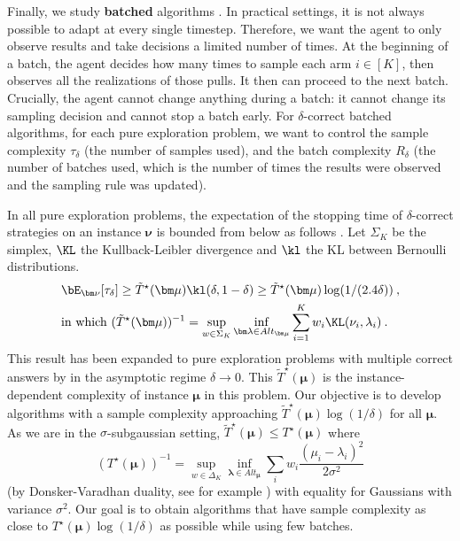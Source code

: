 Finally, we study \textbf{batched} algorithms \citep{agarwalLearningLimitedRounds2017,jinEfficientPureExploration2019}.
In practical settings, it is not always possible to adapt at every single timestep. 
Therefore, we want the agent to only observe results and take decisions a limited number of times.
At the beginning of a batch, the agent decides how many times to sample each arm $i \in [K]$, then observes all the realizations of those pulls.
It then can proceed to the next batch.
Crucially, the agent cannot change anything during a batch: it cannot change its sampling decision and cannot stop a batch early.
For $\delta$-correct batched algorithms, for each pure exploration problem, we want to control the sample complexity $\tau_\delta$ (the number of samples used), and the batch complexity $R_\delta$ (the number of batches used, which is the number of times the results were observed and the sampling rule was updated).


In all pure exploration problems, the expectation of the stopping time of $\delta$-correct strategies on an instance $\bm\nu$ is bounded from below as follows \citep{garivierOptimalBestArm2016}. Let $\Sigma_K$ be the simplex, $\KL$ the Kullback-Leibler divergence and $\kl$ the KL between Bernoulli distributions.
\begin{align*}
&\bE_{\bm\nu}[\tau_\delta]
\ge \tilde{T}^\star(\bm\mu) \kl(\delta,1-\delta)
\ge \tilde{T}^\star(\bm\mu) \log (1/(2.4 \delta))
\: , \\
&\text{in which }
(\tilde{T}^\star(\bm\mu))^{-1}
= \sup_{w\in \Sigma_K}\inf_{\bm\lambda\in Alt_{\bm\mu}} \sum_{i=1}^K w_i\KL(\nu_i,\lambda_i)
\: .
\end{align*}
 This result has been expanded to pure exploration problems with multiple correct answers by \citep{degennePureExplorationMultiple2019} in the asymptotic regime $\delta\rightarrow 0$. This $\tilde{T}^\star(\bm\mu)$ is the instance-dependent complexity of instance $\bm\mu$ in this problem. Our objective is to develop algorithms with a sample complexity approaching $\tilde{T}^\star(\bm\mu)\log(1/\delta)$ for all $\bm\mu$.
 As we are in the $\sigma$-subgaussian setting, $\tilde{T}^\star (\bm\mu) \leq T^\star(\bm\mu)$ where \[(T^\star(\bm\mu))^{-1} = \sup_{w\in \Delta_K}\inf_{\bm\lambda\in Alt_{\bm\mu}} \sum_i w_i\frac{(\mu_i-\lambda_i)^2}{2\sigma^2}\] (by Donsker-Varadhan duality, see for example \citep{wang2021sub}) with equality for Gaussians with variance $\sigma^2$.
Our goal is to obtain algorithms that have sample complexity as close to $T^\star(\bm\mu) \log(1/\delta)$ as possible while using few batches.



